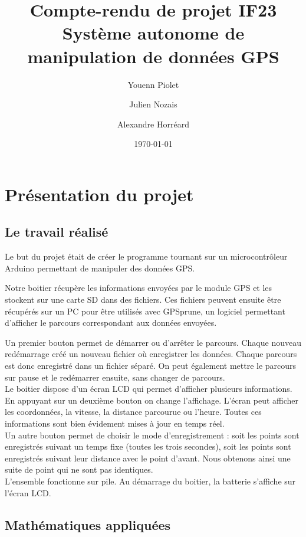 \documentclass[a4paper,12pt,titlepage]{article}
\title{Compte-rendu de projet IF23\\Système autonome de manipulation de données GPS}
\author{Youenn Piolet \and Julien Nozais \and Alexandre Horréard}
\date{\today} %
\begin{document}
\maketitle

\tableofcontents

\newpage

\section{Présentation du projet}

\subsection{Le travail réalisé}

Le but du projet était de créer le programme tournant sur un microcontrôleur Arduino permettant de manipuler des données GPS.

Notre boitier récupère les informations envoyées par le module GPS et les stockent sur une carte SD dans des fichiers. 
Ces fichiers peuvent ensuite être récupérés sur un PC pour être utilisés avec GPSprune, un logiciel permettant d'afficher
le parcours correspondant aux données envoyées.

\bigskip
Un premier bouton permet de démarrer ou d'arrêter le parcours. Chaque nouveau redémarrage créé un nouveau fichier où enregistrer les données.
Chaque parcours est donc enregistré dans un fichier séparé. On peut également mettre le parcours sur pause et le redémarrer ensuite, sans changer de parcours.
\\
Le boitier dispose d'un écran LCD qui permet d'afficher plusieurs informations. En appuyant sur un deuxième bouton on change l'affichage.
L'écran peut afficher les coordonnées, la vitesse, la distance parcourue ou l'heure. Toutes ces informations sont bien évidement mises à jour en temps réel.
\\
Un autre bouton permet de choisir le mode d'enregistrement : soit les points sont enregistrés suivant un temps fixe (toutes les trois secondes),
soit les points sont enregistrés suivant leur distance avec le point d'avant. Nous obtenons ainsi une suite de point qui ne sont pas identiques.
\\
L'ensemble fonctionne sur pile. Au démarrage du boitier, la batterie s'affiche sur l'écran LCD.

\subsection{Mathématiques appliquées}
\end{document}
